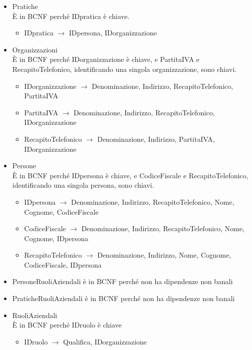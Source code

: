 \documentclass[a4paper,12pt]{article}
\begin{document}
\begin{itemize}
\item Pratiche\\È in BCNF perché IDpratica è chiave.
\begin{itemize}
\item IDpratica $\rightarrow$ IDpersona, IDorganizzazione
\end{itemize}

\item Organizzazioni\\È in BCNF perché IDorganizzazione è chiave, e PartitaIVA e RecapitoTelefonico, identificando una singola organizzazione, sono chiavi.
\begin{itemize}
\item IDorganizzazione $\rightarrow$ Denominazione, Indirizzo, RecapitoTelefonico, PartitaIVA
\item PartitaIVA $\rightarrow$ Denominazione, Indirizzo, RecapitoTelefonico, IDorganizzazione
\item RecapitoTelefonico $\rightarrow$ Denominazione, Indirizzo, PartitaIVA, IDorganizzazione
\end{itemize}

\item Persone\\È in BCNF perché IDpersona è chiave, e CodiceFiscale e RecapitoTelefonico, identificando una singola persona, sono chiavi.
\begin{itemize}
\item IDpersona $\rightarrow$ Denominazione, Indirizzo, RecapitoTelefonico, Nome, Cognome, CodiceFiscale
\item CodiceFiscale $\rightarrow$ Denominazione, Indirizzo, RecapitoTelefonico, Nome, Cognome, IDpersona
\item RecapitoTelefonico $\rightarrow$ Denominazione, Indirizzo, Nome, Cognome, CodiceFiscale, IDpersona
\end{itemize}

\item PersoneRuoliAziendali è in BCNF perché non ha dipendenze non banali

\item PraticheRuoliAziendali è in BCNF perché non ha dipendenze non banali

\item RuoliAziendali\\È in BCNF perché IDruolo è chiave
\begin{itemize}
\item IDruolo $\rightarrow$ Qualifica, IDorganizzazione
\end{itemize}


\end{itemize}
\end{document}
